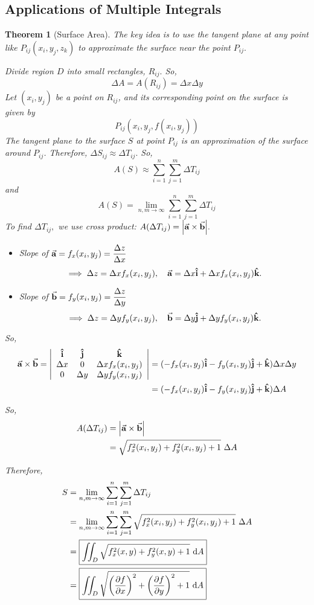 \documentclass[12pt,a4paper]{article}
\newtheorem{thm}{Theorem}[subsection]
\def\dsst{\displaystyle}
\def\d{{\mathrm{d}}}
\def\dA{\d A}
\def\iintD{\dsst\iint_D}
\def\veca{\va{a}}
\def\vecb{\va{b}}
\def\veci{\vu{\boldsymbol{\textbf{i}}}}
\def\vecj{\vu{\boldsymbol{\textbf{j}}}}
\def\veck{\vu{\boldsymbol{\textbf{k}}}}
\begin{document}
\subsection{Applications of Multiple Integrals}
\begin{thm}[Surface Area]	
The key idea is to use the tangent plane at any point like $P_{ij}(x_i,y_j,z_k)$ to approximate the surface near the point $P_{ij}.$\par Divide region $D$ into small rectangles, $R_{ij}.$ So, \[\Delta A=A(R_{ij})=\Delta x\Delta y\] Let $(x_i, y_j)$ be a point on $R_{ij}$, and its corresponding point on the surface is given by \[P_{ij}(x_i, y_j, f(x_i,y_j))\] The tangent plane to the surface $S$ at point $P_{ij}$ is an approximation of the surface around $P_{ij}$. Therefore, $\Delta S_{ij}\approx\Delta T_{ij}.$ So, \[A(S)\approx\sum_{i=1}^n\sum_{j=1}^m\Delta T_{ij}\] and \[A(S)=\lim_{n,m\to\infty}\sum_{i=1}^n\sum_{j=1}^m\Delta T_{ij}\] To find $\Delta T_{ij},$ we use cross product: $A(\Delta T_{ij})=\qty|\veca\times\vecb|.$ 
	\begin{itemize}
		\item Slope of $\veca=f_x(x_i,y_j)=\dfrac{\Delta z}{\Delta x}$ \[\implies\Delta z=\Delta xf_x(x_i,y_j),\quad\veca=\Delta x\veci+\Delta xf_x(x_i,y_j)\veck.\]
		\item Slope of $\vecb=f_y(x_i,y_j)=\dfrac{\Delta z}{\Delta y}$ \[\implies\Delta z=\Delta yf_y(x_i,y_j),\quad\vecb=\Delta y\vecj+\Delta yf_y(x_i,y_j)\veck.\]
	\end{itemize}\par 
	So, \[\begin{aligned}\veca\times\vecb=\qty|\begin{array}{ccc}\veci&\vecj&\veck\\\Delta x&0&\Delta xf_x(x_i,y_j)\\0&\Delta y&\Delta yf_y(x_i,y_j)\end{array}|&=(-f_x(x_i,y_j)\veci-f_y(x_i,y_j)\vecj+\veck)\Delta x\Delta y\\&=(-f_x(x_i,y_j)\veci-f_y(x_i,y_j)\vecj+\veck)\Delta A\end{aligned}\]\par So, \[\begin{aligned}A(\Delta T_{ij})&=\qty|\veca\times\vecb|\\&=\sqrt{f_x^2(x_i,y_j)+f_y^2(x_i,y_j)+1}\ \Delta A\end{aligned}\]\par Therefore, \[\begin{aligned}S&=\lim_{n,m\to\infty}\sum_{i=1}^n\sum_{j=1}^m\Delta T_{ij}\\&=\lim_{n,m\to\infty}\sum_{i=1}^n\sum_{j=1}^m\sqrt{f_x^2(x_i,y_j)+f_y^2(x_i,y_j)+1}\ \Delta A\\&=\boxed{\iintD\sqrt{f_x^2(x,y)+f_y^2(x,y)+1}\ \dA}\\&=\boxed{\iintD\sqrt{\qty(\pdv{f}{x})^2+\qty(\pdv{f}{y})^2+1}\ \dA}\end{aligned}\]
\end{thm}
\end{document}
